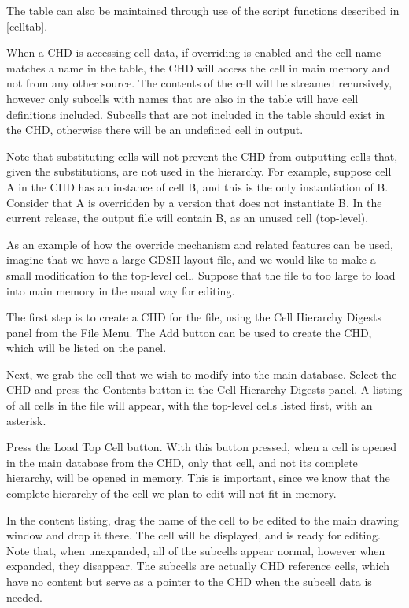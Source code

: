 The table can also be maintained through use of the script functions
described in \ref{celltab}.

When a CHD is accessing cell data, if overriding is enabled and the
cell name matches a name in the table, the CHD will access the cell in
main memory and not from any other source.  The contents of the cell
will be streamed recursively, however only subcells with names that
are also in the table will have cell definitions included.  Subcells
that are not included in the table should exist in the CHD, otherwise
there will be an undefined cell in output.

Note that substituting cells will not prevent the CHD from outputting
cells that, given the substitutions, are not used in the hierarchy. 
For example, suppose cell A in the CHD has an instance of cell B, and
this is the only instantiation of B.  Consider that A is overridden by
a version that does not instantiate B.  In the current release, the
output file will contain B, as an unused cell (top-level).

As an example of how the override mechanism and related features can
be used, imagine that we have a large GDSII layout file, and we would
like to make a small modification to the top-level cell.  Suppose that
the file to too large to load into main memory in the usual way for
editing.

The first step is to create a CHD for the file, using the {\cb Cell
Hierarchy Digests} panel from the {\cb File Menu}.  The {\cb Add}
button can be used to create the CHD, which will be listed on the
panel.

Next, we grab the cell that we wish to modify into the main database. 
Select the CHD and press the {\cb Contents} button in the {\cb Cell
Hierarchy Digests} panel.  A listing of all cells in the file will
appear, with the top-level cells listed first, with an asterisk.

Press the {\cb Load Top Cell} button.  With this button pressed, when
a cell is opened in the main database from the CHD, only that cell,
and not its complete hierarchy, will be opened in memory.  This is
important, since we know that the complete hierarchy of the cell we
plan to edit will not fit in memory.

In the content listing, drag the name of the cell to be edited to the
main drawing window and drop it there.  The cell will be displayed,
and is ready for editing.  Note that, when unexpanded, all of the
subcells appear normal, however when expanded, they disappear.  The
subcells are actually CHD reference cells, which have no content but
serve as a pointer to the CHD when the subcell data is needed.

